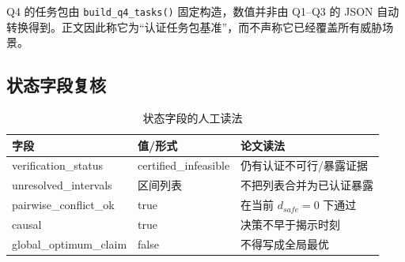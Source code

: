 Q4 的任务包由 \texttt{build\_q4\_tasks()} 固定构造，数值并非由 Q1--Q3 的 JSON 自动转换得到。正文因此称它为“认证任务包基准”，而不声称它已经覆盖所有威胁场景。

\subsection{状态字段复核}

\begin{table}[!htbp]
\centering
\caption{状态字段的人工读法}
\begin{tabular}{lll}
\toprule
字段 & 值/形式 & 论文读法 \\
\midrule
verification\_status & certified\_infeasible & 仍有认证不可行/暴露证据 \\
unresolved\_intervals & 区间列表 & 不把列表合并为已认证暴露 \\
pairwise\_conflict\_ok & true & 在当前 $d_{safe}=0$ 下通过 \\
causal & true & 决策不早于揭示时刻 \\
global\_optimum\_claim & false & 不得写成全局最优 \\
\bottomrule
\end{tabular}
\end{table}
